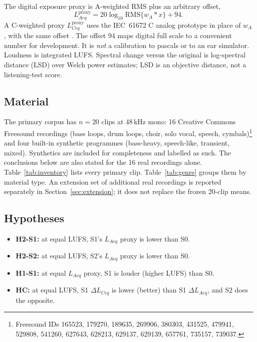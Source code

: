 \documentclass[12pt,journal,onecolumn]{IEEEtran}
\begin{document}
The digital exposure proxy is A-weighted RMS plus an arbitrary offset,
\begin{equation}
L_{Aeq}^{\mathrm{proxy}} = 20\log_{10}\mathrm{RMS}\{w_A * x\} + 94.
\end{equation}
A C-weighted proxy $L_{Ceq}^{\mathrm{proxy}}$ uses the IEC~61672 C analog prototype in place of $w_A$, with the same offset \cite{IEC61672}. The offset 94 maps digital full scale to a convenient number for development. It is \emph{not} a calibration to pascals or to an ear simulator. Loudness is integrated LUFS. Spectral change versus the original is log-spectral distance (LSD) over Welch power estimates; LSD is an objective distance, not a listening-test score.

\subsection{Material}

The primary corpus has $n=20$ clips at 48\,kHz mono: 16 Creative Commons Freesound recordings (bass loops, drum loops, choir, solo vocal, speech, cymbals)\footnote{Freesound IDs 165523, 179270, 189635, 269906, 380303, 431525, 479941, 529808, 541260, 627643, 628213, 629137, 629139, 657761, 735157, 739037.} and four built-in synthetic programmes (bass-heavy, speech-like, transient, mixed). Synthetics are included for completeness and labelled as such. The conclusions below are also stated for the 16 real recordings alone. Table~\ref{tab:inventory} lists every primary clip. Table~\ref{tab:genre} groups them by material type. An extension set of additional real recordings is reported separately in Section~\ref{sec:extension}; it does not replace the frozen 20-clip means.



\subsection{Hypotheses}

\begin{itemize}
\item \textbf{H2-S1:} at equal LUFS, S1's $L_{Aeq}$ proxy is lower than S0.
\item \textbf{H2-S2:} at equal LUFS, S2's $L_{Aeq}$ proxy is lower than S0.
\item \textbf{H1-S1:} at equal $L_{Aeq}$ proxy, S1 is louder (higher LUFS) than S0.
\item \textbf{HC:} at equal LUFS, S1 $\Delta L_{Ceq}$ is lower (better) than S1 $\Delta L_{Aeq}$, and S2 does the opposite.
\end{itemize}
\end{document}
